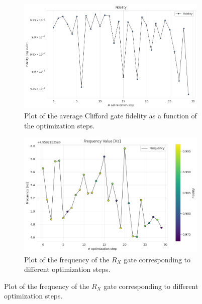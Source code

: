 \begin{figure}[h]
    \centering
    \begin{subfigure}[t]{0.45\textwidth}
        \includegraphics[width=\textwidth]{figures/png/RB_optimization/CMA/fidelity.png}
        \caption{Plot of the average Clifford gate fidelity as a function of the optimization steps.}
        \label{fig:CMA:fidelity}
    \end{subfigure}
    \hfill
    \begin{subfigure}[t]{0.45\textwidth}
        \includegraphics[width=\textwidth]{figures/png/RB_optimization/CMA/CMA_frequency.png}
        \caption{Plot of the frequency of the $R_X$ gate corresponding to different optimization steps.}
        \label{fig:CMA:frequency}
    \end{subfigure}

    \vspace{0.5cm}


\end{figure}
